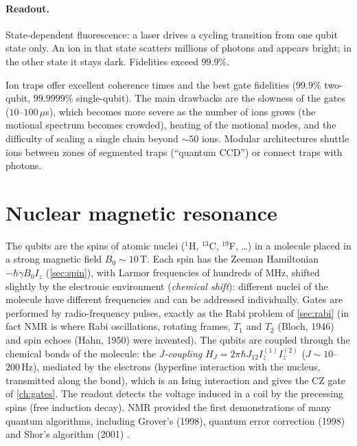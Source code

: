 \paragraph{Readout.} State-dependent fluorescence: a laser drives a cycling transition from one qubit state only. An ion in that state scatters millions of photons and appears bright; in the other state it stays dark. Fidelities exceed $99.9\%$.

Ion traps offer excellent coherence times and the best gate fidelities ($99.9\%$ two-qubit, $99.9999\%$ single-qubit). The main drawbacks are the slowness of the gates ($10$--$100\,\mu$s), which becomes more severe as the number of ions grows
(the motional spectrum becomes crowded), heating of the motional modes, and the difficulty of scaling a single chain beyond $\sim50$ ions. Modular architectures shuttle ions between zones of segmented traps (``quantum CCD'') or connect traps with photons.

\section{Nuclear magnetic resonance}\label{sec:nmr}
The qubits are the spins of atomic nuclei (${}^1$H, ${}^{13}$C, ${}^{19}$F, \dots) in a molecule placed in a strong magnetic field $B_0\sim10$\,T. Each spin has the Zeeman Hamiltonian $-\hbar\gamma B_0I_z$ (\cref{sec:spin}), with Larmor frequencies of hundreds of MHz,
shifted slightly by the electronic environment (\emph{chemical shift}): different nuclei of the molecule have different frequencies and can be addressed individually. Gates are performed by radio-frequency pulses, exactly as the Rabi problem of
\cref{sec:rabi} (in fact NMR is where Rabi oscillations, rotating frames, $T_1$ and $T_2$ (Bloch, 1946) and spin echoes (Hahn, 1950) were invented). The qubits are coupled through the chemical bonds of the molecule: the \emph{$J$-coupling}
$H_J=2\pi\hbar J_{12}I_z^{(1)}I_z^{(2)}$ ($J\sim10$--$200$\,Hz), mediated by the electrons (hyperfine interaction with the nucleus, transmitted along the bond), which is an Ising interaction and gives the CZ gate of \cref{ch:gates}. The readout detects the voltage induced
in a coil by the precessing spins (free induction decay). NMR provided the first demonstrations of many quantum algorithms, including Grover's (1998), quantum error correction (1998) \cite{Cory1998} and Shor's algorithm (2001) \cite{Vandersypen2001}.

